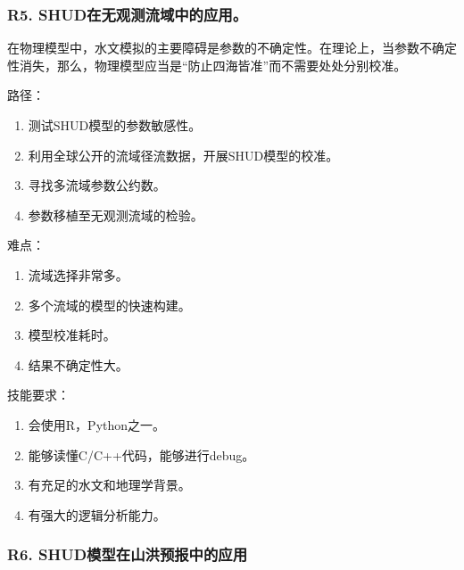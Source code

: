 \documentclass[
]{book}
\providecommand{\tightlist}{%
  \setlength{\itemsep}{0pt}\setlength{\parskip}{0pt}}
\begin{document}
\hypertarget{r5.-shudux5728ux65e0ux89c2ux6d4bux6d41ux57dfux4e2dux7684ux5e94ux7528}{%
\subsubsection{\texorpdfstring{\textbf{R5. SHUD在无观测流域中的应用。}}{R5. SHUD在无观测流域中的应用。}}\label{r5.-shudux5728ux65e0ux89c2ux6d4bux6d41ux57dfux4e2dux7684ux5e94ux7528}}

在物理模型中，水文模拟的主要障碍是参数的不确定性。在理论上，当参数不确定性消失，那么，物理模型应当是``防止四海皆准''而不需要处处分别校准。

路径：

\begin{enumerate}
\def\labelenumi{\arabic{enumi}.}
\tightlist
\item
  测试SHUD模型的参数敏感性。
\item
  利用全球公开的流域径流数据，开展SHUD模型的校准。
\item
  寻找多流域参数公约数。
\item
  参数移植至无观测流域的检验。
\end{enumerate}

难点：

\begin{enumerate}
\def\labelenumi{\arabic{enumi}.}
\tightlist
\item
  流域选择非常多。
\item
  多个流域的模型的快速构建。
\item
  模型校准耗时。
\item
  结果不确定性大。
\end{enumerate}

技能要求：

\begin{enumerate}
\def\labelenumi{\arabic{enumi}.}
\tightlist
\item
  会使用R，Python之一。
\item
  能够读懂C/C++代码，能够进行debug。
\item
  有充足的水文和地理学背景。
\item
  有强大的逻辑分析能力。
\end{enumerate}

\hypertarget{r6.-shudux6a21ux578bux5728ux5c71ux6d2aux9884ux62a5ux4e2dux7684ux5e94ux7528}{%
\subsubsection{\texorpdfstring{\textbf{R6. SHUD模型在山洪预报中的应用}}{R6. SHUD模型在山洪预报中的应用}}\label{r6.-shudux6a21ux578bux5728ux5c71ux6d2aux9884ux62a5ux4e2dux7684ux5e94ux7528}}
\end{document}
